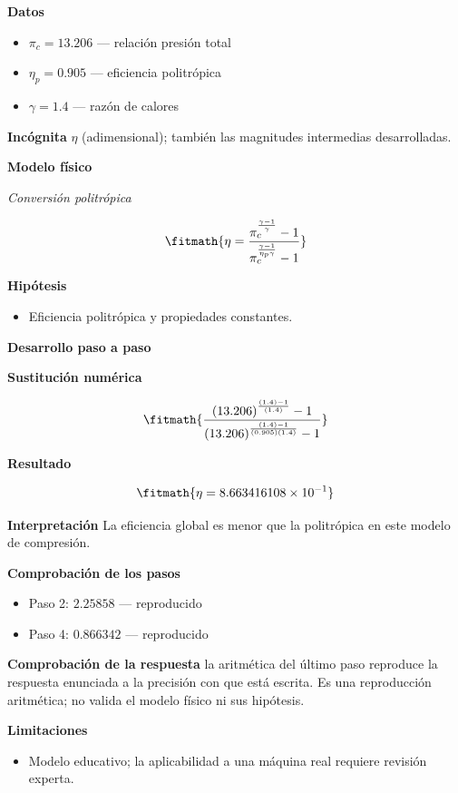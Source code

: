 \documentclass[10pt,openany]{book}
\begin{document}
\noindent\textbf{Datos}
\begin{itemize}
\item $\pi_c = 13.206$ — relación presión total
\item $\eta_p = 0.905$ — eficiencia politrópica
\item $\gamma = 1.4$ — razón de calores
\end{itemize}

\noindent\textbf{Incógnita}
$\eta$ (adimensional); también las magnitudes intermedias desarrolladas.

\noindent\textbf{Modelo físico}

\noindent\textit{Conversión politrópica}

\[
\fitmath{\eta=\frac{\pi_c^{\frac{\gamma - 1}{\gamma}} - 1}{\pi_c^{\frac{\gamma - 1}{\eta_p \gamma}} - 1}}
\]

\noindent\textbf{Hipótesis}
\begin{itemize}
\item Eficiencia politrópica y propiedades constantes.
\end{itemize}

\noindent\textbf{Desarrollo paso a paso}



\noindent\textbf{Sustitución numérica}

\[
\fitmath{\frac{\left(13.206\right)^{\frac{\left(1.4\right) - 1}{\left(1.4\right)}} - 1}{\left(13.206\right)^{\frac{\left(1.4\right) - 1}{\left(0.905\right) \left(1.4\right)}} - 1}}
\]

\noindent\textbf{Resultado}

\[
\fitmath{\eta=8.663416108\times10^{-1}}
\]

\noindent\textbf{Interpretación}
La eficiencia global es menor que la politrópica en este modelo de compresión.

\noindent\textbf{Comprobación de los pasos}
\begin{itemize}
\item Paso 2: $2.25858$ — reproducido
\item Paso 4: $0.866342$ — reproducido
\end{itemize}

\noindent\textbf{Comprobación de la respuesta} la aritmética del último paso reproduce la respuesta enunciada a la precisión con que está escrita. Es una reproducción aritmética; no valida el modelo físico ni sus hipótesis.

\noindent\textbf{Limitaciones}
\begin{itemize}
\item Modelo educativo; la aplicabilidad a una máquina real requiere revisión experta.
\end{itemize}
\end{document}
